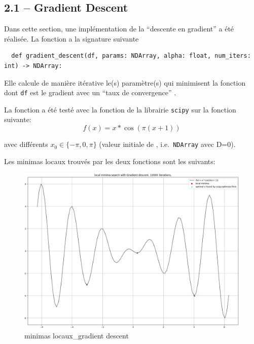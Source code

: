 \documentclass[
]{article}
\begin{document}
\newpage

\hypertarget{gradient-descent}{%
\subsection{2.1 -- Gradient Descent}\label{gradient-descent}}

Dans cette section, une implémentation de la ``descente en gradient'' a
été réalisée. La fonction a la signature suivante

\begin{lstlisting}
  def gradient_descent(df, params: NDArray, alpha: float, num_iters: int) -> NDArray:  
\end{lstlisting}

Elle calcule de manière itérative le(s) paramètre(s)  qui
minimisent la fonction dont \texttt{df} est le gradient avec un ``taux
de convergence'' .

La fonction a été testé avec la fonction 
\cite{ScipyOptimizeFmin} de la librairie \texttt{scipy} sur la fonction
suivante: \[
f(x) = x * \cos(\pi  (x + 1))
\]

avec différents \(x_0 \in \{-\pi, 0, \pi\}\) (valeur initiale de
, i.e.~\texttt{NDArray} avec D=0).

Les minimas locaux trouvés par les deux fonctions sont les suivants:

\begin{figure}
\centering
\includegraphics[width=1\textwidth,height=\textheight]{../res/3.1_gradient_descent_minima.png}
\caption{minimas locaux\_gradient descent}
\end{figure}
\end{document}
